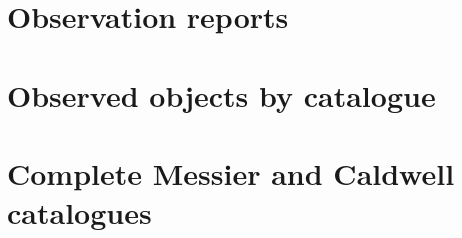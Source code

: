 \documentclass[10pt,twoside,a4paper,english]{article}
\begin{document}
\section{Observation reports}

\newpage 

\newpage 

\newpage 

\newpage 

\newpage 

\newpage 

\newpage 

\newpage 

\newpage 

\newpage 

\newpage 

\newpage 

\newpage 

\newpage 

\newpage 

\newpage 

\newpage 

\newpage 

\newpage 

\newpage 

\newpage 

\newpage 

\newpage 

\newpage 

\newpage 
\section{Observed objects by catalogue}

\newpage 

\newpage 

\newpage 

\newpage 

\newpage 

\newpage 

\newpage 

\newpage 
\newpage 
 
\small 
\noindent 
 
\section{Complete Messier and Caldwell catalogues} 
 
\end{document}
